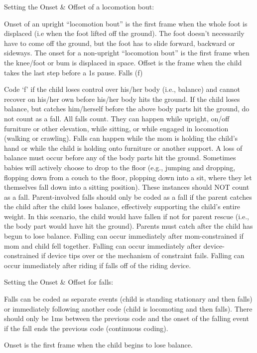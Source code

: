 \documentclass[
]{book}
\begin{document}
Setting the Onset \& Offset of a locomotion bout:

Onset of an upright ``locomotion bout'' is the first frame when the whole foot is displaced (i.e when the foot lifted off the ground). The foot doesn't necessarily have to come off the ground, but the foot has to slide forward, backward or sideways. The onset for a non-upright ``locomotion bout'' is the first frame when the knee/foot or bum is displaced in space.
Offset is the frame when the child takes the last step before a 1s pause.
Falls (f)

Code `f' if the child loses control over his/her body (i.e., balance) and cannot recover on his/her own before his/her body hits the ground. If the child loses balance, but catches him/herself before the above body parts hit the ground, do not count as a fall.
All falls count. They can happen while upright, on/off furniture or other elevation, while sitting, or while engaged in locomotion (walking or crawling). Falls can happen while the mom is holding the child's hand or while the child is holding onto furniture or another support.
A loss of balance must occur before any of the body parts hit the ground. Sometimes babies will actively choose to drop to the floor (e.g., jumping and dropping, flopping down from a couch to the floor, plopping down into a sit, where they let themselves fall down into a sitting position). These instances should NOT count as a fall.
Parent-involved falls should only be coded as a fall if the parent catches the child after the child loses balance, effectively supporting the child's entire weight. In this scenario, the child would have fallen if not for parent rescue (i.e., the body part would have hit the ground). Parents must catch after the child has begun to lose balance.
Falling can occur immediately after mom-constrained if mom and child fell together. Falling can occur immediately after device-constrained if device tips over or the mechanism of constraint fails. Falling can occur immediately after riding if falls off of the riding device.

Setting the Onset \& Offset for falls:

Falls can be coded as separate events (child is standing stationary and then falls) or immediately following another code (child is locomoting and then falls). There should only be 1ms between the previous code and the onset of the falling event if the fall ends the previous code (continuous coding).

Onset is the first frame when the child begins to lose balance.
\end{document}
